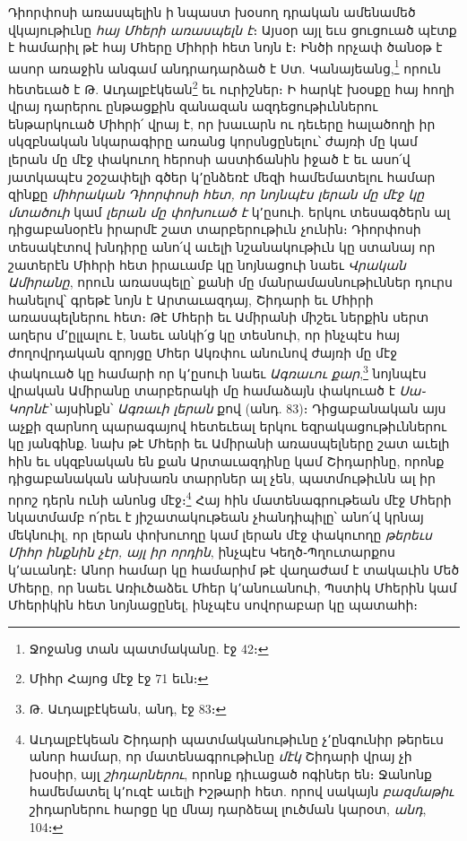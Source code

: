 \documentclass{article}
\begin{document}
{Դիորփոսի առասպելին ի նպաստ խօսող դրական ամենամեծ վկայութիւնը \emph{հայ Մհերի առասպելն է}։ Այսօր այլ եւս ցուցուած պէտք է համարիլ թէ հայ Մհերը Միհրի հետ նոյն է։ Ինծի որչափ ծանօթ է ասոր առաջին անգամ անդրադարձած է Ստ. Կանայեանց,\footnote{Ջոջանց տան պատմականը. էջ 42։} որուն հետեւած է Թ. Աւդալբէկեան\footnote{Միհր Հայոց մէջ էջ 71 եւն։} եւ ուրիշներ։ Ի հարկէ խօսքը հայ հողի վրայ դարերու ընթացքին զանազան ազդեցութիւններու ենթարկուած Միհրի՛ վրայ է, որ խաւարն ու դեւերը հալածողի իր սկզբնական նկարագիրը առանց կորսնցընելու՝ ժայռի մը կամ լերան մը մէջ փակուող հերոսի աստիճանին իջած է եւ ասո՛վ յատկապէս շօշափելի գծեր կ՚ընձեռէ մեզի համեմատելու համար զինքը \emph{միհրական Դիորփոսի հետ, որ նոյնպէս լերան մը մէջ կը մտածուի} կամ \emph{լերան մը փոխուած է} կ՚ըսուի. երկու տեսագծերն ալ դիցաբանօրէն իրարմէ շատ տարբերութիւն չունին։ Դիորփոսի տեսակէտով խնդիրը անո՛վ աւելի նշանակութիւն կը ստանայ որ շատերէն Միհրի հետ իրաւամբ կը նոյնացուի նաեւ \emph{Վրական Ամիրանը}, որուն առասպելը՝ քանի մը մանրամասնութիւններ դուրս հանելով՝ գրեթէ նոյն է Արտաւազդայ, Շիդարի եւ Մհիրի առասպելներու հետ։ Թէ Մհերի եւ Ամիրանի միշեւ ներքին սերտ աղերս մ՚ըլլալու է, նաեւ անկի՛ց կը տեսնուի, որ ինչպէս հայ ժողովրդական զրոյցը Մհեր Ակռփու անունով ժայռի մը մէջ փակուած կը համարի որ կ՚ըսուի նաեւ \emph{Ագռաւու քար},\footnote{Թ. Աւդալբէկեան, անդ, էջ 83։} նոյնպէս վրական Ամիրանը տարբերակի մը համաձայն փակուած է \emph{Սա֊Կորնէ՝} այսինքն՝ \emph{Ագռաւի լերան} քով (անդ. 83)։ Դիցաբանական այս աչքի զարնող պարագայով հետեւեալ երկու եզրակացութիւններու կը յանգինք. նախ թէ Մհերի եւ Ամիրանի առասպելները շատ աւելի հին եւ սկզբնական են քան Արտաւազդինը կամ Շիդարինը, որոնք դիցաբանական անխառն տարրներ ալ չեն, պատմութիւնն ալ իր որոշ դերն ունի անոնց մէջ։\footnote{Աւդալբէկեան Շիդարի պատմականութիւնը չ՚ընգունիր թերեւս անոր համար, որ մատենագրութիւնը \emph{մէկ} Շիդարի վրայ չի խօսիր, այլ \emph{շիդարներու}, որոնք դիւացած ոգիներ են։ Ջանոնք համեմատել կ՚ուզէ աւելի Իշթարի հետ. որով սակայն \emph{բազմաթիւ} շիդարներու հարցը կը մնայ դարձեալ լուծման կարօտ, \emph{անդ}, 104։} Հայ հին մատենագրութեան մէջ Մհերի նկատմամբ ո՛րեւ է յիշատակութեան չհանդիպիլը՝ անո՛վ կրնայ մեկնուիլ, որ լերան փոխուողը կամ լերան մէջ փակուողը \emph{թերեւս Միհր ինքնին չէր, այլ իր որդին}, ինչպէս Կեղծ֊Պղուտարքոս կ՚աւանդէ։ Անոր համար կը համարիմ թէ վաղաժամ է տակաւին Մեծ Մհերը, որ նաեւ Առիւծաձեւ Մհեր կ՚անուանուի, Պստիկ Մհերին կամ Մհերիկին հետ նոյնացընել, ինչպէս սովորաբար կը պատահի։

}
\end{document}
